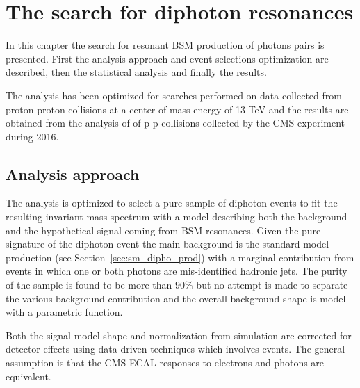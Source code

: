 \chapter{The search for diphoton resonances}
\label{chapter:diphoton}

In this chapter the search for resonant BSM production of photons pairs is presented.
First the analysis approach and event selections optimization are described, then
the statistical analysis and finally the results.

The analysis has been optimized for searches performed on data collected from proton-proton
collisions at a center of mass energy of 13 TeV and the results are obtained from the analysis
of \lumisix of p-p collisions collected by the CMS experiment during 2016. 


\section{Analysis approach}
The analysis is optimized to select a pure sample of diphoton events to fit the resulting
invariant mass spectrum with a model describing both the background and the hypothetical signal
coming from BSM resonances. Given the pure signature of the diphoton event the main background
is the standard model production (see Section~\ref{sec:sm_dipho_prod}) with a marginal contribution
from events in which one or both photons are mis-identified hadronic jets. The purity of the sample
is found to be more than $90\%$ but no attempt is made to separate the various background contribution
and the overall background shape is model with a parametric function.

Both the signal model shape and normalization from simulation are corrected for detector effects using
data-driven techniques which involves \Zee events. The general assumption is that the CMS ECAL
responses to electrons and photons are equivalent. 

